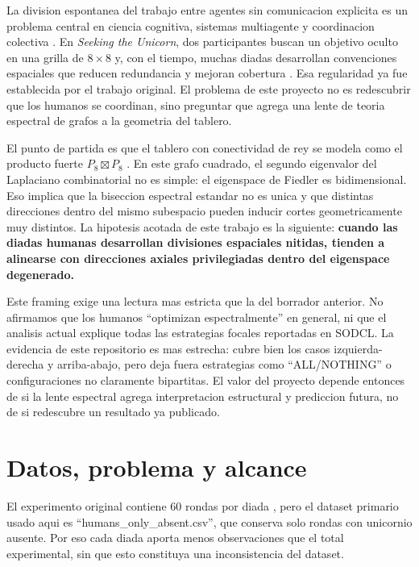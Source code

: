 \documentclass[conference]{IEEEtran}
\begin{document}
La division espontanea del trabajo entre agentes sin comunicacion explicita es un problema central en ciencia cognitiva, sistemas multiagente y coordinacion colectiva \cite{andrade2021,goldstone2024}. En \emph{Seeking the Unicorn}, dos participantes buscan un objetivo oculto en una grilla de $8\times8$ y, con el tiempo, muchas diadas desarrollan convenciones espaciales que reducen redundancia y mejoran cobertura \cite{andrade2021}. Esa regularidad ya fue establecida por el trabajo original. El problema de este proyecto no es redescubrir que los humanos se coordinan, sino preguntar que agrega una lente de teoria espectral de grafos a la geometria del tablero.

El punto de partida es que el tablero con conectividad de rey se modela como el producto fuerte $P_8 \boxtimes P_8$ \cite{hammack2011}. En este grafo cuadrado, el segundo eigenvalor del Laplaciano combinatorial no es simple: el eigenspace de Fiedler es bidimensional. Eso implica que la biseccion espectral estandar no es unica y que distintas direcciones dentro del mismo subespacio pueden inducir cortes geometricamente muy distintos. La hipotesis acotada de este trabajo es la siguiente: \textbf{cuando las diadas humanas desarrollan divisiones espaciales nitidas, tienden a alinearse con direcciones axiales privilegiadas dentro del eigenspace degenerado.}

Este framing exige una lectura mas estricta que la del borrador anterior. No afirmamos que los humanos ``optimizan espectralmente'' en general, ni que el analisis actual explique todas las estrategias focales reportadas en SODCL. La evidencia de este repositorio es mas estrecha: cubre bien los casos izquierda-derecha y arriba-abajo, pero deja fuera estrategias como ``ALL/NOTHING'' o configuraciones no claramente bipartitas. El valor del proyecto depende entonces de si la lente espectral agrega interpretacion estructural y prediccion futura, no de si redescubre un resultado ya publicado.

\section{Datos, problema y alcance}

El experimento original contiene 60 rondas por diada \cite{andrade2021}, pero el dataset primario usado aqui es ``humans\_only\_absent.csv'', que conserva solo rondas con unicornio ausente. Por eso cada diada aporta menos observaciones que el total experimental, sin que esto constituya una inconsistencia del dataset.
\end{document}
